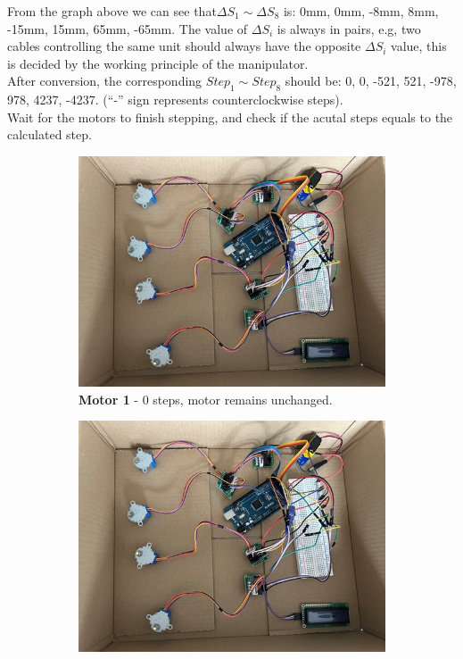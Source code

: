 From the graph above we can see that$\Delta S_1 \sim \Delta S_8$ is: 0mm, 0mm, -8mm, 8mm, -15mm, 15mm, 65mm, 
-65mm. The value of $\Delta S_i$ is always in pairs, e.g, two cables controlling the same unit should always have 
the opposite $\Delta S_i$ value, this is decided by the working principle of the manipulator. \\
After conversion, the corresponding $Step_1 \sim Step_8$ should be: 0, 0, -521, 521, -978, 978, 4237, -4237. 
(“-” sign represents counterclockwise steps). \\
Wait for the motors to finish stepping, and check if the acutal steps equals to the calculated step. \\
\begin{figure}[H] %
    \centering %
    \captionsetup{labelsep=colon}
    \begin{subfigure}{0.45\textwidth} %
        \centering
        \includegraphics[width=\linewidth]{Image/Result/example.jpg}
        \caption{\centering \textbf{Motor 1} - 0 steps, motor remains unchanged.}
    \end{subfigure}
    \hfill
    \begin{subfigure}{0.45\textwidth} %
        \centering
        \includegraphics[width=\linewidth]{Image/Result/example.jpg}

\end{subfigure}
\end{figure}
